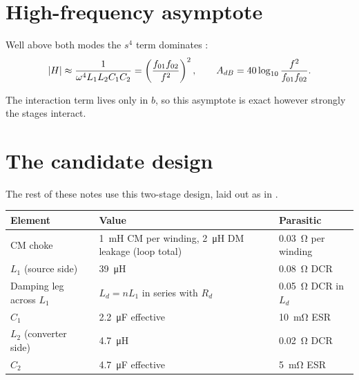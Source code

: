 \section{High-frequency asymptote}
\label{sec:hf-asymptote}

Well above both modes the $s^4$ term dominates :
\begin{equation}\label{eq:hf-two-stage}
	\lvert H\rvert \approx \frac{1}{\omega^4 L_1L_2C_1C_2} = \left(\frac{f_{01}f_{02}}{f^2}\right)^2,
	\qquad A_{dB} = 40\log_{10}\frac{f^2}{f_{01}f_{02}}.
\end{equation}

The interaction term lives only in $b$, so this asymptote is exact however
strongly the stages interact.

\section{The candidate design}
\label{sec:candidate}

The rest of these notes use this two-stage design, laid out as in
.

\begin{center}
	\begin{tabular}{@{}lll@{}}
		\toprule
		Element                  & Value                                                            & Parasitic                     \\
		\midrule
		CM choke                 & \qty{1}{\milli\henry} CM per winding, \qty{2}{\micro\henry} DM leakage (loop total) & \qty{0.03}{\ohm} per winding  \\
		$L_1$ (source side)      & \qty{39}{\micro\henry}                                           & \qty{0.08}{\ohm} DCR          \\
		Damping leg across $L_1$ & $L_d = nL_1$ in series with $R_d$                                & \qty{0.05}{\ohm} DCR in $L_d$ \\
		$C_1$                    & \qty{2.2}{\micro\farad} effective                                & \qty{10}{\milli\ohm} ESR      \\
		$L_2$ (converter side)   & \qty{4.7}{\micro\henry}                                          & \qty{0.02}{\ohm} DCR          \\
		$C_2$                    & \qty{4.7}{\micro\farad} effective                                & \qty{5}{\milli\ohm} ESR       \\
		\bottomrule
	\end{tabular}
\end{center}


